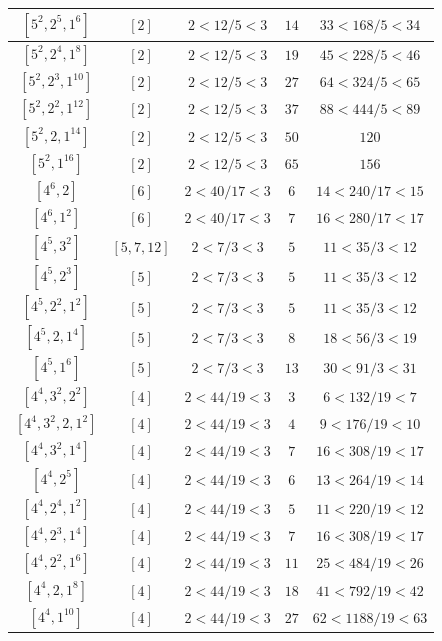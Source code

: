 \documentclass{article}%
\begin{document}
\begin{center}
\begin{longtable}{||c|c|c|c|c||}
$[5^{2}, 2^{5}, 1^{6}]$ & $[2]$ & $2 < 12/5 < 3$ & $14$ & $33 < 168/5 < 34$ \\ \hline 
$[5^{2}, 2^{4}, 1^{8}]$ & $[2]$ & $2 < 12/5 < 3$ & $19$ & $45 < 228/5 < 46$ \\ \hline 
$[5^{2}, 2^{3}, 1^{10}]$ & $[2]$ & $2 < 12/5 < 3$ & $27$ & $64 < 324/5 < 65$ \\ \hline 
$[5^{2}, 2^{2}, 1^{12}]$ & $[2]$ & $2 < 12/5 < 3$ & $37$ & $88 < 444/5 < 89$ \\ \hline 
$[5^{2}, 2, 1^{14}]$ & $[2]$ & $2 < 12/5 < 3$ & $50$ & $120$ \\ \hline 
$[5^{2}, 1^{16}]$ & $[2]$ & $2 < 12/5 < 3$ & $65$ & $156$ \\ \hline 
$[4^{6}, 2]$ & $[6]$ & $2 < 40/17 < 3$ & $6$ & $14 < 240/17 < 15$ \\ \hline 
$[4^{6}, 1^{2}]$ & $[6]$ & $2 < 40/17 < 3$ & $7$ & $16 < 280/17 < 17$ \\ \hline 
$[4^{5}, 3^{2}]$ & $[5, 7, 12]$ & $2 < 7/3 < 3$ & $5$ & $11 < 35/3 < 12$ \\ \hline 
$[4^{5}, 2^{3}]$ & $[5]$ & $2 < 7/3 < 3$ & $5$ & $11 < 35/3 < 12$ \\ \hline 
$[4^{5}, 2^{2}, 1^{2}]$ & $[5]$ & $2 < 7/3 < 3$ & $5$ & $11 < 35/3 < 12$ \\ \hline 
$[4^{5}, 2, 1^{4}]$ & $[5]$ & $2 < 7/3 < 3$ & $8$ & $18 < 56/3 < 19$ \\ \hline 
$[4^{5}, 1^{6}]$ & $[5]$ & $2 < 7/3 < 3$ & $13$ & $30 < 91/3 < 31$ \\ \hline 
$[4^{4}, 3^{2}, 2^{2}]$ & $[4]$ & $2 < 44/19 < 3$ & $3$ & $6 < 132/19 < 7$ \\ \hline 
$[4^{4}, 3^{2}, 2, 1^{2}]$ & $[4]$ & $2 < 44/19 < 3$ & $4$ & $9 < 176/19 < 10$ \\ \hline 
$[4^{4}, 3^{2}, 1^{4}]$ & $[4]$ & $2 < 44/19 < 3$ & $7$ & $16 < 308/19 < 17$ \\ \hline 
$[4^{4}, 2^{5}]$ & $[4]$ & $2 < 44/19 < 3$ & $6$ & $13 < 264/19 < 14$ \\ \hline 
$[4^{4}, 2^{4}, 1^{2}]$ & $[4]$ & $2 < 44/19 < 3$ & $5$ & $11 < 220/19 < 12$ \\ \hline 
$[4^{4}, 2^{3}, 1^{4}]$ & $[4]$ & $2 < 44/19 < 3$ & $7$ & $16 < 308/19 < 17$ \\ \hline 
$[4^{4}, 2^{2}, 1^{6}]$ & $[4]$ & $2 < 44/19 < 3$ & $11$ & $25 < 484/19 < 26$ \\ \hline 
$[4^{4}, 2, 1^{8}]$ & $[4]$ & $2 < 44/19 < 3$ & $18$ & $41 < 792/19 < 42$ \\ \hline 
$[4^{4}, 1^{10}]$ & $[4]$ & $2 < 44/19 < 3$ & $27$ & $62 < 1188/19 < 63$ \\ \hline 

\end{longtable}
\end{center}
\end{document}
